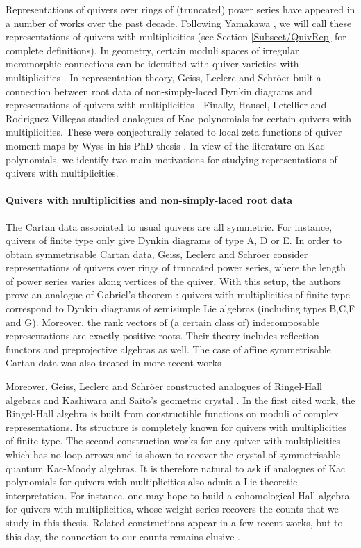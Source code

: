\documentclass[11pt,english]{article}
\numberwithin{equation}{section}
\numberwithin{figure}{section}
\theoremstyle{definition}
\theoremstyle{plain}
\theoremstyle{remark}
\begin{document}
Representations of quivers over rings of (truncated) power series
have appeared in a number of works over the past decade. Following
Yamakawa \cite{Yam10}, we will call these representations of quivers
with multiplicities (see Section \ref{Subsect/QuivRep} for complete
definitions). In geometry, certain moduli spaces of irregular meromorphic
connections can be identified with quiver varieties with multiplicities
\cite{Yam10,HWW23}. In representation theory, Geiss, Leclerc and
Schröer built a connection between root data of non-simply-laced Dynkin
diagrams and representations of quivers with multiplicities \cite{GLS17a,GLS17b,GLS16,GLS18a,GLS18b}.
Finally, Hausel, Letellier and Rodriguez-Villegas \cite{HLRV24} studied
analogues of Kac polynomials for certain quivers with multiplicities.
These were conjecturally related to local zeta functions of quiver
moment maps by Wyss in his PhD thesis \cite{Wys17b}. In view of the
literature on Kac polynomials, we identify two main motivations for
studying representations of quivers with multiplicities.

\paragraph*{Quivers with multiplicities and non-simply-laced root data}

The Cartan data associated to usual quivers are all symmetric. For
instance, quivers of finite type only give Dynkin diagrams of type
A, D or E. In order to obtain symmetrisable Cartan data, Geiss, Leclerc
and Schröer consider representations of quivers over rings of truncated
power series, where the length of power series varies along vertices
of the quiver. With this setup, the authors prove an analogue of Gabriel's
theorem \cite{GLS17a}: quivers with multiplicities of finite type
correspond to Dynkin diagrams of semisimple Lie algebras (including
types B,C,F and G). Moreover, the rank vectors of (a certain class
of) indecomposable representations are exactly positive roots. Their
theory includes reflection functors and preprojective algebras as
well. The case of affine symmetrisable Cartan data was also treated
in more recent works \cite{HLS23,Pfe23}.

Moreover, Geiss, Leclerc and Schröer constructed analogues of Ringel-Hall
algebras \cite{GLS16} and Kashiwara and Saito's geometric crystal
\cite{GLS18a}. In the first cited work, the Ringel-Hall algebra is
built from constructible functions on moduli of complex representations.
Its structure is completely known for quivers with multiplicities
of finite type. The second construction works for any quiver with
multiplicities which has no loop arrows and is shown to recover the
crystal of symmetrisable quantum Kac-Moody algebras. It is therefore
natural to ask if analogues of Kac polynomials for quivers with multiplicities
also admit a Lie-theoretic interpretation. For instance, one may hope
to build a cohomological Hall algebra for quivers with multiplicities,
whose weight series recovers the counts that we study in this thesis.
Related constructions appear in a few recent works, but to this day,
the connection to our counts remains elusive \cite{YZ22,VV23b}.
\end{document}

